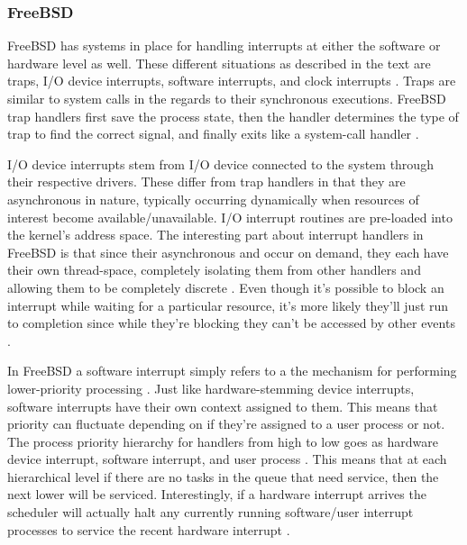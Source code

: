 \subsubsection{FreeBSD}
\label{sub:Interrupts FreeBSD}
\par FreeBSD has systems in place for handling interrupts at either the software or hardware level as well.
These different situations as described in the text are traps, I/O device interrupts, software interrupts, and clock interrupts \cite{bsd:1}.
Traps are similar to system calls in the regards to their synchronous executions.
FreeBSD trap handlers first save the process state, then the handler determines the type of trap to find the correct signal, and finally exits like a system-call handler \cite{bsd:1}.

\par I/O device interrupts stem from I/O device connected to the system through their respective drivers.
These differ from trap handlers in that they are asynchronous in nature, typically occurring dynamically when resources of interest become available/unavailable.
I/O interrupt routines are pre-loaded into the kernel's address space.
The interesting part about interrupt handlers in FreeBSD is that since their asynchronous and occur on demand, they each have their own thread-space, completely isolating them from other handlers and allowing them to be completely discrete \cite{bsd:1}.
Even though it's possible to block an interrupt while waiting for a particular resource, it's more likely they'll just run to completion since while they're blocking they can't be accessed by other events \cite{bsd:1}.

\par In FreeBSD a software interrupt simply refers to a the mechanism for performing lower-priority processing \cite{bsd:1}.
Just like hardware-stemming device interrupts, software interrupts have their own context assigned to them.
This means that priority can fluctuate depending on if they're assigned to a user process or not.
The process priority hierarchy for handlers from high to low goes as hardware device interrupt, software interrupt, and user process \cite{bsd:1}.
This means that at each hierarchical level if there are no tasks in the queue that need service, then the next lower will be serviced.
Interestingly, if a hardware interrupt arrives the scheduler will actually halt any currently running software/user interrupt processes to service the recent hardware interrupt \cite{bsd:1}.

